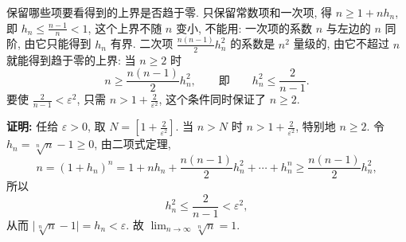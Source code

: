 \documentclass[UTF8,openany]{ctexbook}
\theoremstyle{chinesetextbook}
\newenvironment{cnproof}{\par\indent\textbf{证明:} \ignorespaces}{\par}
\begin{document}
保留哪些项要看得到的上界是否趋于零. 只保留常数项和一次项, 得 $n\ge1+nh_n$, 即 $\displaystyle h_n\le\frac{n-1}n<1$, 这个上界不随 $n$ 变小, 不能用: 一次项的系数 $n$ 与左边的 $n$ 同阶, 由它只能得到 $h_n$ 有界. 二次项 $\displaystyle\frac{n(n-1)}2h_n^2$ 的系数是 $n^2$ 量级的, 由它不超过 $n$ 就能得到趋于零的上界: 当 $n\ge2$ 时
\[
n\ge\frac{n(n-1)}2h_n^2,\qquad\text{即}\qquad h_n^2\le\frac2{n-1}.
\]
要使 $\displaystyle\frac2{n-1}<\varepsilon^2$, 只需 $\displaystyle n>1+\frac2{\varepsilon^2}$, 这个条件同时保证了 $n\ge2$.
\begin{cnproof}
任给 $\varepsilon>0$, 取 $\displaystyle N=\left[1+\frac2{\varepsilon^2}\right]$. 当 $n>N$ 时 $\displaystyle n>1+\frac2{\varepsilon^2}$, 特别地 $n\ge2$. 令 $h_n=\sqrt[n]n-1\ge0$, 由二项式定理,
\[
n=(1+h_n)^n=1+nh_n+\frac{n(n-1)}2h_n^2+\cdots+h_n^n\ge\frac{n(n-1)}2h_n^2,
\]
所以
\[
h_n^2\le\frac2{n-1}<\varepsilon^2,
\]
从而 $\bigl|\sqrt[n]n-1\bigr|=h_n<\varepsilon$. 故 $\displaystyle\lim_{n\to\infty}\sqrt[n]n=1$.
\end{cnproof}
\end{document}
